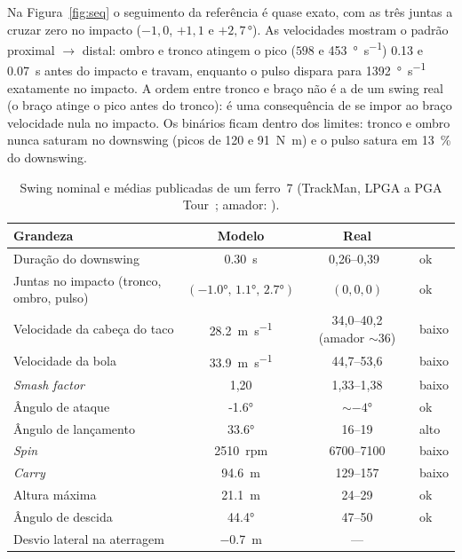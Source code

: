 \documentclass[11pt,a4paper]{article}
\begin{document}
Na Figura~\ref{fig:seq} o seguimento da referência é quase exato, com as três
juntas a cruzar zero no impacto ($-1{,}0$, $+1{,}1$ e $+2{,}7$\,\si{\degree}).
As velocidades mostram o padrão proximal $\to$ distal: ombro e tronco atingem o
pico ($\num{598}$ e \SI{453}{\degree\per\second}) \SI{0.13}{} e
\SI{0.07}{\second} antes do impacto e travam, enquanto o pulso dispara para
\SI{1392}{\degree\per\second} exatamente no impacto. A ordem entre tronco e
braço não é a de um swing real (o braço atinge o pico antes do tronco): é uma
consequência de se impor ao braço velocidade nula no impacto. Os binários ficam
dentro dos limites: tronco e ombro nunca saturam no downswing (picos de 120 e
\SI{91}{\newton\meter}) e o pulso satura em \SI{13}{\percent} do downswing.

\begin{table}[h]
\centering
\caption{Swing nominal e médias publicadas de um ferro~7 (TrackMan, LPGA a PGA
Tour~\cite{trackman2024}; amador: \cite{golfmonthly_7iron}).}
\label{tab:nominal}
\small
\begin{tabular}{lccl}
\toprule
Grandeza & Modelo & Real & \\
\midrule
Duração do downswing          & \SI{0.30}{\second} & 0,26--0,39~\cite{grober2010} & ok \\
Juntas no impacto (tronco, ombro, pulso) & $(\ang{-1.0},\,\ang{+1.1},\,\ang{+2.7})$ & $(0,0,0)$ & ok \\
Velocidade da cabeça do taco  & \SI{28.2}{\meter\per\second} & 34,0--40,2 (amador $\sim$36) & baixo \\
Velocidade da bola            & \SI{33.9}{\meter\per\second} & 44,7--53,6 & baixo \\
\emph{Smash factor}           & 1,20 & 1,33--1,38 & baixo \\
Ângulo de ataque              & \ang{-1.6} & $\sim\ang{-4}$ & ok \\
Ângulo de lançamento          & \ang{33.6} & 16--19 & alto \\
\emph{Spin}                   & \SI{2510}{rpm} & 6700--7100 & baixo \\
\emph{Carry}                  & \SI{94.6}{\meter} & 129--157 & baixo \\
Altura máxima                 & \SI{21.1}{\meter} & 24--29 & ok \\
Ângulo de descida             & \ang{44.4} & 47--50 & ok \\
Desvio lateral na aterragem   & \SI{-0.7}{\meter} & --- & \\
\bottomrule
\end{tabular}
\end{table}
\end{document}
